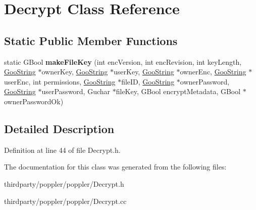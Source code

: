 \hypertarget{class_decrypt}{}\section{Decrypt Class Reference}
\label{class_decrypt}
\subsection*{Static Public Member Functions}
\begin{DoxyCompactItemize}
\item 
\mbox{\label{class_decrypt_a8f2aeaff1b4a0632b400a79bf4b61dc3}} 
static G\+Bool {\bfseries make\+File\+Key} (int enc\+Version, int enc\+Revision, int key\+Length, \hyperlink{class_goo_string}{Goo\+String} $\ast$owner\+Key, \hyperlink{class_goo_string}{Goo\+String} $\ast$user\+Key, \hyperlink{class_goo_string}{Goo\+String} $\ast$owner\+Enc, \hyperlink{class_goo_string}{Goo\+String} $\ast$user\+Enc, int permissions, \hyperlink{class_goo_string}{Goo\+String} $\ast$file\+ID, \hyperlink{class_goo_string}{Goo\+String} $\ast$owner\+Password, \hyperlink{class_goo_string}{Goo\+String} $\ast$user\+Password, Guchar $\ast$file\+Key, G\+Bool encrypt\+Metadata, G\+Bool $\ast$owner\+Password\+Ok)
\end{DoxyCompactItemize}


\subsection{Detailed Description}


Definition at line 44 of file Decrypt.\+h.



The documentation for this class was generated from the following files\+:\begin{DoxyCompactItemize}
\item 
thirdparty/poppler/poppler/Decrypt.\+h\item 
thirdparty/poppler/poppler/Decrypt.\+cc\end{DoxyCompactItemize}
